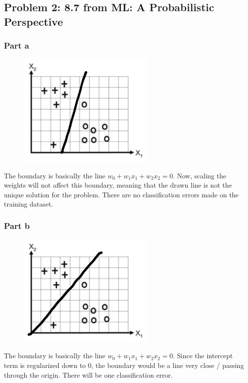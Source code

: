 \documentclass{article}
\begin{document}
\subsection*{Problem 2: 8.7 from ML: A Probabilistic Perspective}
\subsubsection*{Part a}
\begin{minipage}{0.475\linewidth}
\begin{figure}[H]
\centering
\includegraphics[width=0.6\textwidth]{./images/8_7_a.jpg}
\end{figure}
\end{minipage}
\hfill
\begin{minipage}{0.475\linewidth}
The boundary is basically the line \(w_{0} + w_{1}x_{1} + w_{2}x_{2} = 0\). Now, scaling the weights will not affect this boundary, meaning that the drawn line is not the unique solution for the problem. There are no classification errors made on the training dataset.
\end{minipage}

\subsubsection*{Part b}
\begin{minipage}{0.475\linewidth}
\begin{figure}[H]
\centering
\includegraphics[width=0.6\textwidth]{./images/8_7_b.jpg}
\end{figure}
\end{minipage}
\hfill
\begin{minipage}{0.475\linewidth}
The boundary is basically the line \(w_{0} + w_{1}x_{1} + w_{2}x_{2} = 0\). Since the intercept term is regularized down to 0, the boundary would be a line very close / passing through the origin. There will be one classification error.
\end{minipage}
\end{document}
